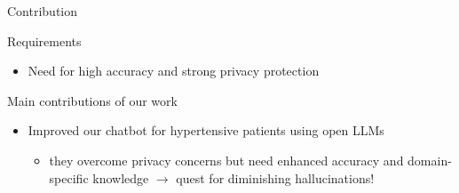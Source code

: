 \documentclass[handout]{beamer}\mode<handout>{\usetheme{AMSBolognaFC}}
\begin{document}
\begin{frame}{Contribution}

 \begin{block}{Requirements}
 	\begin{itemize}
        \item Need for high \alert{accuracy} and strong \alert{privacy} protection
        \end{itemize}
\end{block}

    \begin{block}{Main contributions of our work}
        \begin{itemize}
            \item Improved our chatbot for hypertensive patients using \alert{open LLMs}
            \begin{itemize}
            \item they  overcome privacy concerns but need enhanced accuracy and domain-specific knowledge
        		$\rightarrow$ quest for diminishing \alert{hallucinations}!
       		

\end{itemize}
\end{itemize}
\end{block}
\end{frame}
\end{document}
